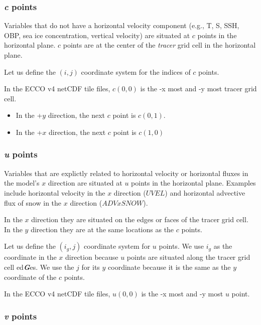 \documentclass[11pt]{article}
\providecommand{\tightlist}{%
      \setlength{\itemsep}{0pt}\setlength{\parskip}{0pt}}
\begin{document}
\subsubsection{\texorpdfstring{\emph{c}
points}{c points}}\label{c-points}

Variables that do not have a horizontal velocity component (e.g., T, S,
SSH, OBP, sea ice concentration, vertical velocity) are situated at
\(c\) points in the horizontal plane. \(c\) points are at the center of
the \emph{tracer} grid cell in the horizontal plane.

Let us define the \((i,j)\) coordinate system for the indices of \(c\)
points.

In the ECCO v4 netCDF tile files, \(c(0,0)\) is the -x most and -y most
tracer grid cell.

\begin{itemize}
\tightlist
\item
  In the +\(y\) direction, the next \(c\) point is \(c(0,1)\).
\item
  In the +\(x\) direction, the next \(c\) point is \(c(1,0)\)
\end{itemize}

\subsubsection{\texorpdfstring{\emph{u}
points}{u points}}\label{u-points}

Variables that are explictly related to horizontal velocity or
horizontal fluxes in the model's \(x\) direction are situated at \(u\)
points in the horizontal plane. Examples include horizontal velocity in
the \(x\) direction (\(UVEL\)) and horizontal advective flux of snow in
the \(x\) direction (\(ADVxSNOW\)).

In the \(x\) direction they are situated on the edges or faces of the
tracer grid cell. In the \(y\) direction they are at the same locations
as the \(c\) points.

Let us define the \((i_g, j)\) coordinate system for \(u\) points. We
use \(i_g\) as the coordinate in the \(x\) direction because \(u\)
points are situated along the tracer grid cell ed\textbf{\emph{G}}es. We
use the \(j\) for its \(y\) coordinate because it is the same as the
\(y\) coordinate of the \(c\) points.

In the ECCO v4 netCDF tile files, \(u(0,0)\) is the -x most and -y most
\(u\) point.

\subsubsection{\texorpdfstring{\emph{v}
points}{v points}}\label{v-points}
\end{document}
